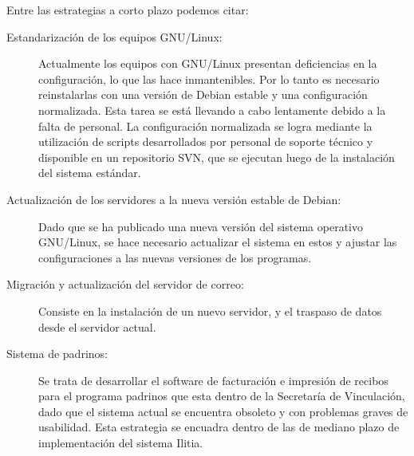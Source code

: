 \documentclass[a4paper,11pt,oneside]{article}
\begin{document}
Entre las estrategias a corto plazo podemos citar:
%
\begin{description}
%
\item[Estandarización de los equipos GNU/Linux:] Actualmente los
  equipos con GNU/Linux presentan deficiencias en la configuración, lo
  que las hace inmantenibles. Por lo tanto es necesario reinstalarlas
  con una versión de Debian estable y una configuración
  normalizada. Esta tarea se está llevando a cabo lentamente debido a
  la falta de personal. La configuración normalizada se logra mediante
  la utilización de scripts desarrollados por personal de soporte
  técnico y disponible en un repositorio SVN, que se ejecutan luego de
  la instalación del sistema estándar.
%
\item[Actualización de los servidores a la nueva versión estable de
  Debian:] Dado que se ha publicado una nueva versión del sistema
  operativo GNU/Linux, se hace necesario actualizar el sistema en
  estos y ajustar las configuraciones a las nuevas versiones de los
  programas.
%
\item[Migración y actualización del servidor de correo:]
  Consiste en la instalación de un nuevo servidor, y el traspaso de
  datos desde el servidor actual.
\item[Sistema de padrinos:]Se trata de desarrollar el software de
  facturación e impresión de recibos para el programa padrinos que
  esta dentro de la Secretaría de Vinculación, dado que el sistema
  actual se encuentra obsoleto y con problemas graves de
  usabilidad. Esta estrategia se encuadra dentro de las de mediano
  plazo de implementación del sistema Ilitia.
%
\end{description}
\end{document}
